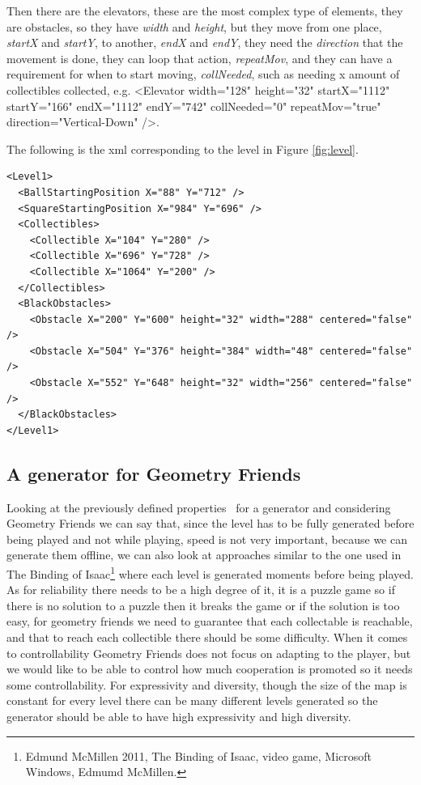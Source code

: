 \documentclass[runningheads]{llncs}
\begin{document}
Then there are the elevators, these are the most complex type of elements, they are obstacles, so they have \textit{width} and \textit{height}, but they move from one place, \textit{startX} and \textit{startY}, to another, \textit{endX} and \textit{endY}, they need the \textit{direction} that the movement is done, they can loop that action, \textit{repeatMov}, and they can have a requirement for when to start moving, \textit{collNeeded}, such as needing x amount of collectibles collected, e.g. \textless Elevator width="128" height="32" startX="1112" startY="166" endX="1112" endY="742" collNeeded="0" repeatMov="true" direction="Vertical-Down" /\textgreater.

The following is the xml corresponding to the level in Figure \ref{fig:level}.
\begingroup
    \lstset{language=XML}
    \fontsize{8pt}{10pt}\selectfont
    \begin{lstlisting}
<Level1>
  <BallStartingPosition X="88" Y="712" />
  <SquareStartingPosition X="984" Y="696" />
  <Collectibles>
    <Collectible X="104" Y="280" />
    <Collectible X="696" Y="728" />
    <Collectible X="1064" Y="200" />
  </Collectibles>
  <BlackObstacles>
    <Obstacle X="200" Y="600" height="32" width="288" centered="false" />
    <Obstacle X="504" Y="376" height="384" width="48" centered="false" />
    <Obstacle X="552" Y="648" height="32" width="256" centered="false" />
  </BlackObstacles>
</Level1>
    \end{lstlisting}
\endgroup

\subsection{A generator for Geometry Friends}
Looking at the previously defined properties~\cite{ref_togelius} for a generator and considering Geometry Friends we can say that, since the level has to be fully generated before being played and not while playing, speed is not very important, because we can generate them offline, we can also look at approaches similar to the one used in The Binding of Isaac\footnote{Edmund McMillen 2011, The Binding of Isaac, video game, Microsoft Windows, Edmumd McMillen.} where each level is generated moments before being played. As for reliability there needs to be a high degree of it, it is a puzzle game so if there is no solution to a puzzle then it breaks the game or if the solution is too easy, for geometry friends we need to guarantee that each collectable is reachable, and that to reach each collectible there should be some difficulty. When it comes to controllability Geometry Friends does not focus on adapting to the player, but we would like to be able to control how much cooperation is promoted so it needs some controllability. For expressivity and diversity, though the size of the map is constant for every level there can be many different levels generated so the generator should be able to have high expressivity and high diversity.
\end{document}
